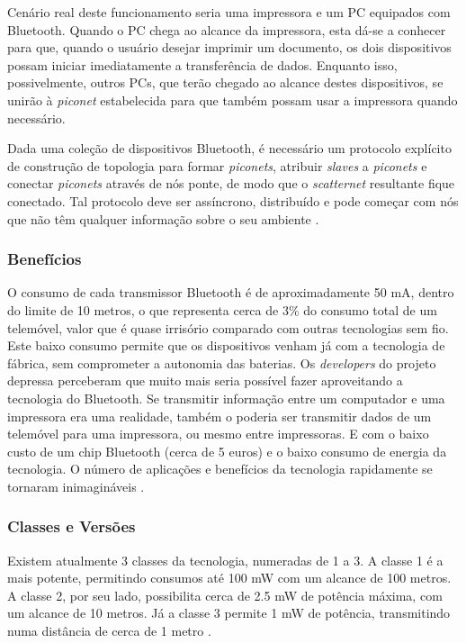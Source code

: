 \documentclass[conference]{IEEEtran}
\begin{document}
Cenário real deste funcionamento seria uma impressora e um PC equipados com Bluetooth. Quando o PC chega ao alcance da impressora, esta dá-se a conhecer para que, quando o usuário desejar imprimir um documento, os dois dispositivos possam iniciar imediatamente a transferência de dados. Enquanto isso, possivelmente, outros PCs, que terão chegado ao alcance destes dispositivos, se unirão à \textit{piconet} estabelecida para que também possam usar a impressora quando necessário.

Dada uma coleção de dispositivos Bluetooth, é necessário um protocolo explícito de construção de topologia para formar \textit{piconets}, atribuir \textit{slaves} a \textit{piconets} e conectar \textit{piconets} através de nós ponte, de modo que o \textit{scatternet} resultante fique conectado. Tal protocolo deve ser assíncrono, distribuído e pode começar com nós que não têm qualquer informação sobre o seu ambiente \cite{salonidis2005distributed}.

\subsubsection{Benefícios}

O consumo de cada transmissor Bluetooth é de aproximadamente 50 mA, dentro do limite de 10 metros, o que representa cerca de 3\% do consumo total de um telemóvel, valor que é quase irrisório comparado com outras tecnologias sem fio. 
Este baixo consumo permite que os dispositivos venham já com a tecnologia de fábrica, sem comprometer a autonomia das baterias. 
Os \textit{developers} do projeto depressa perceberam que muito mais seria possível fazer aproveitando a tecnologia do Bluetooth. 
Se transmitir informação entre um computador e uma impressora era uma realidade, também o poderia ser transmitir dados de um telemóvel para uma impressora, ou mesmo entre impressoras. 
E com o baixo custo de um chip Bluetooth (cerca de 5 euros) e o baixo consumo de energia da tecnologia. 
O número de aplicações e benefícios da tecnologia rapidamente se tornaram inimagináveis \cite{kobayashi2004tecnologia}.

\subsubsection{Classes e Versões}

Existem atualmente 3 classes da tecnologia, numeradas de 1 a 3. 
A classe 1 é a mais potente, permitindo consumos até 100 mW com um alcance de 100 metros. 
A classe 2, por seu lado, possibilita cerca de 2.5 mW de potência máxima, com um alcance de 10 metros. 
Já a classe 3 permite 1 mW de potência, transmitindo numa distância de cerca de 1 metro \cite{bluetoothwiki}.
\end{document}
